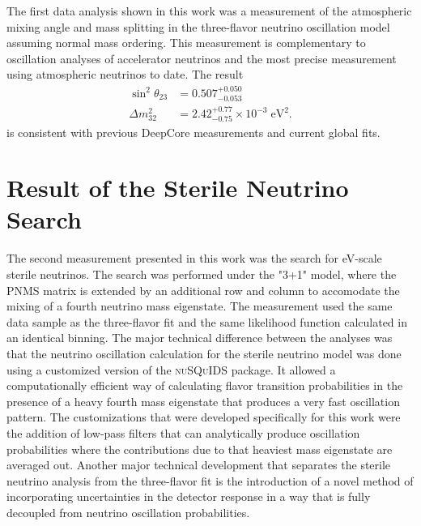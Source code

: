 The first data analysis shown in this work was a measurement of the atmospheric mixing angle and mass splitting in the three-flavor neutrino oscillation model assuming normal mass ordering. This measurement is complementary to oscillation analyses of accelerator neutrinos and the most precise measurement using atmospheric neutrinos to date. The result
\begin{align*}
    \sin^2\theta_{23} &= 0.507_{-0.053}^{+0.050}\\
    \Delta m^2_{32} &= 2.42_{-0.75}^{+0.77} \times10^{-3}\;\mathrm{eV}^2.
\end{align*}
is consistent with previous DeepCore measurements and current global fits.

\section{Result of the Sterile Neutrino Search}
\label{sec:summary-sterile-osc}

The second measurement presented in this work was the search for eV-scale sterile neutrinos. The search was performed under the "3+1" model, where the PNMS matrix is extended by an additional row and column to accomodate the mixing of a fourth neutrino mass eigenstate. The measurement used the same data sample as the three-flavor fit and the same likelihood function calculated in an identical binning. The major technical difference between the analyses was that the neutrino oscillation calculation for the sterile neutrino model was done using a customized version of the \textsc{nuSQuIDS} package. It allowed a computationally efficient way of calculating flavor transition probabilities in the presence of a heavy fourth mass eigenstate that produces a very fast oscillation pattern. The customizations that were developed specifically for this work were the addition of low-pass filters that can analytically produce oscillation probabilities where the contributions due to that heaviest mass eigenstate are averaged out. Another major technical development that separates the sterile neutrino analysis from the three-flavor fit is the introduction of a novel method of incorporating uncertainties in the detector response in a way that is fully decoupled from neutrino oscillation probabilities.

